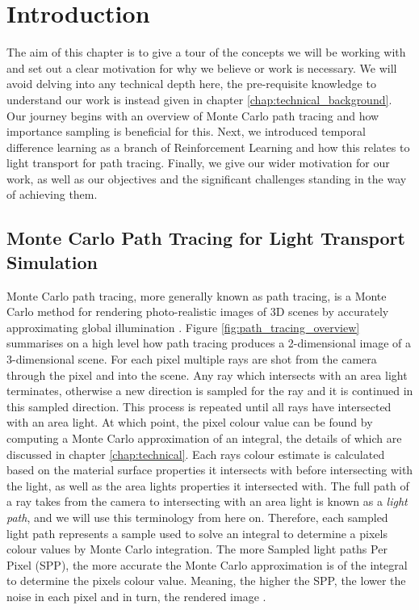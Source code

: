 \documentclass[../dissertation.tex]{subfiles}
\begin{document}
\chapter{Introduction}
\label{chap:context}

The aim of this chapter is to give a tour of the concepts we will be working with and set out a clear motivation for why we believe or work is necessary. We will avoid delving into any technical depth here, the pre-requisite knowledge to understand our work is instead given in chapter \ref{chap:technical_background}. Our journey begins with an overview of Monte Carlo path tracing and how importance sampling is beneficial for this. Next, we introduced temporal difference learning as a branch of Reinforcement Learning and how this relates to light transport for path tracing. Finally, we give our wider motivation for our work, as well as our objectives and the significant challenges standing in the way of achieving them.

\section{Monte Carlo Path Tracing for Light Transport Simulation}
\label{sec:conceptual_path_trace}
Monte Carlo path tracing, more generally known as path tracing, is a Monte Carlo method for rendering photo-realistic images of 3D  scenes by accurately approximating global illumination \cite{christensen2016path}. Figure \ref{fig:path_tracing_overview} summarises on a high level how path tracing produces a 2-dimensional image of a 3-dimensional scene. For each pixel multiple rays are shot from the camera through the pixel and into the scene. Any ray which intersects with an area light terminates, otherwise a new direction is sampled for the ray and it is continued in this sampled direction. This process is repeated until all rays have intersected with an area light.  At which point, the pixel colour value can  be found by computing a Monte Carlo approximation of an integral, the details of which are discussed in chapter \ref{chap:technical}. Each rays colour estimate is calculated based on the material surface properties it intersects with before intersecting with the light, as well as the area lights properties it intersected with. The full path of a ray takes from the camera to intersecting with an area light is known as a \textit{light path}, and we will use this terminology from here on. Therefore, each sampled light path represents a sample used to solve an integral to determine a pixels colour values by Monte Carlo integration. The more Sampled light paths Per Pixel (SPP), the more accurate the Monte Carlo approximation is of the integral to determine the pixels colour value. Meaning, the higher the SPP, the lower the noise in each pixel and in turn, the rendered image \cite{kajiya1986rendering}. 
\end{document}
